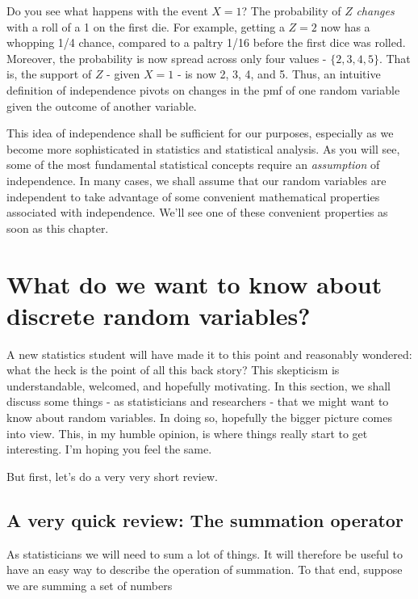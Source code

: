\documentclass[
]{book}
\theoremstyle{definition}
\theoremstyle{definition}
\theoremstyle{definition}
\theoremstyle{definition}
\theoremstyle{remark}
\begin{document}
Do you see what happens with the event \(X = 1\)? The probability of \(Z\) \emph{changes} with a roll of a 1 on the first die. For example, getting a \(Z = 2\) now has a whopping 1/4 chance, compared to a paltry 1/16 before the first dice was rolled. Moreover, the probability is now spread across only four values - \(\{2,3,4,5\}\). That is, the support of \(Z\) - given \(X = 1\) - is now 2, 3, 4, and 5. Thus, an intuitive definition of independence pivots on changes in the pmf of one random variable given the outcome of another variable.

This idea of independence shall be sufficient for our purposes, especially as we become more sophisticated in statistics and statistical analysis. As you will see, some of the most fundamental statistical concepts require an \emph{assumption} of independence. In many cases, we shall assume that our random variables are independent to take advantage of some convenient mathematical properties associated with independence. We'll see one of these convenient properties as soon as this chapter.

\section{What do we want to know about discrete random variables?}\label{what-do-we-want-to-know-about-discrete-random-variables}

A new statistics student will have made it to this point and reasonably wondered: what the heck is the point of all this back story? This skepticism is understandable, welcomed, and hopefully motivating. In this section, we shall discuss some things - as statisticians and researchers - that we might want to know about random variables. In doing so, hopefully the bigger picture comes into view. This, in my humble opinion, is where things really start to get interesting. I'm hoping you feel the same.

But first, let's do a very very short review.

\subsection{A very quick review: The summation operator}\label{a-very-quick-review-the-summation-operator}

As statisticians we will need to sum a lot of things. It will therefore be useful to have an easy way to describe the operation of summation. To that end, suppose we are summing a set of numbers
\end{document}
